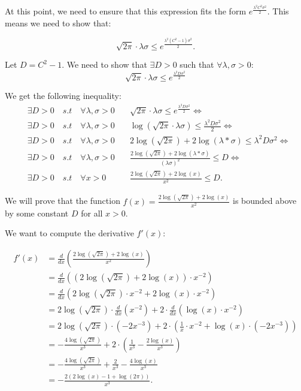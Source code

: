 \documentclass[a4 paper]{article}
\theoremstyle{boldStyle}
\theoremstyle{boldBlueStyle}
\theoremstyle{boldPurpleStyle}
\theoremstyle{boldRedStyle}
\begin{document}
At this point, we need to ensure that this expression fits the form \(e^{\frac{\lambda^2 C^2 \sigma^2}{2}}\). This means we need to show that:

\[
\sqrt{2\pi} \cdot \lambda \sigma \leq e^{\frac{\lambda^2 (C^2 - 1) \sigma^2}{2}}.
\]

Let $D = C^2 - 1$. We need to show that $\exists D > 0$ such that $\forall \lambda, \sigma > 0$:
\[
\sqrt{2\pi} \cdot \lambda \sigma \leq e^{\frac{\lambda^2 D \sigma^2}{2}}
\]

We get the following inequality:
\begin{align*}  
&\exists D > 0 \quad {s.t} \quad \forall \lambda , \sigma >0 \quad &\sqrt{2\pi} \cdot \lambda \sigma \leq e^{\frac{\lambda^2 D \sigma^2}{2}} \iff \\
&\exists D > 0 \quad {s.t} \quad \forall \lambda , \sigma >0 \quad &\log(\sqrt{2\pi} \cdot \lambda \sigma) \leq \frac{\lambda^2 D \sigma^2}{2} \iff \\
&\exists D > 0 \quad {s.t} \quad \forall \lambda , \sigma >0 \quad &2\log(\sqrt{2\pi}) + 2\log(\lambda * \sigma) \leq \lambda^2 D \sigma^2 \iff \\
&\exists D > 0 \quad {s.t} \quad \forall \lambda , \sigma >0 \quad &\frac{2\log(\sqrt{2\pi}) + 2\log(\lambda * \sigma)}{(\lambda \sigma)^2} \leq D \iff \\
&\exists D > 0 \quad {s.t} \quad \forall x >0  &\frac{2\log(\sqrt{2\pi}) + 2\log(x)}{x^2} \leq D.
\end{align*}

We will prove that the function $f(x) = \frac{2\log(\sqrt{2\pi}) + 2\log(x)}{x^2}$ is bounded above by some constant $D$ for all $x > 0$. 

We want to compute the derivative \(f'(x)\):

\begin{align*}
f'(x) &= \frac{d}{dx} \left(\frac{2\log(\sqrt{2\pi}) + 2\log(x)}{x^2}\right) \\
&= \frac{d}{dx} \left( \left(2\log(\sqrt{2\pi}) + 2\log(x)\right) \cdot x^{-2} \right) \\
&= \frac{d}{dx} \left( 2\log(\sqrt{2\pi}) \cdot x^{-2} + 2\log(x) \cdot x^{-2} \right) \\
&= 2\log(\sqrt{2\pi}) \cdot \frac{d}{dx}(x^{-2}) + 2 \cdot \frac{d}{dx}(\log(x) \cdot x^{-2}) \\
&= 2\log(\sqrt{2\pi}) \cdot (-2x^{-3}) + 2 \cdot \left( \frac{1}{x} \cdot x^{-2} + \log(x) \cdot (-2x^{-3}) \right) \\
&= -\frac{4\log(\sqrt{2\pi})}{x^3} + 2 \cdot \left( \frac{1}{x^3} - \frac{2\log(x)}{x^3} \right) \\
&= -\frac{4\log(\sqrt{2\pi})}{x^3} + \frac{2}{x^3} - \frac{4\log(x)}{x^3} \\
&= -\frac{2(2\log(x) - 1 + \log(2\pi))}{x^3}.
\end{align*}
\end{document}
